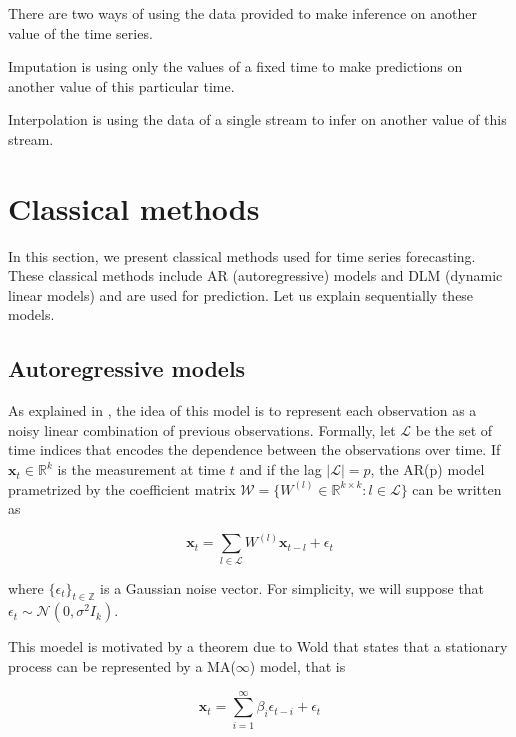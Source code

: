 \documentclass{article}
\begin{document}
There are two ways of using the data provided to make inference on another value of the time series.
\begin{definition}{Imputation}
is using only the values of a fixed time to make predictions on another value of this particular time.
\end{definition}

\begin{definition}{Interpolation}
 is using the data of a single stream to infer on another value of this stream.
\end{definition}

\section{Classical methods}
\label{clas}
In this section, we present classical methods used for time series forecasting.
These classical methods include AR (autoregressive) models and DLM (dynamic linear models) and are used for prediction.
Let us explain sequentially these models.

\subsection*{Autoregressive models}
As explained in \cite{pmlr-v37-anava15}, the idea of this model is to represent each observation as a noisy linear combination of previous observations.
Formally, let $\mathcal{L}$ be the set of time indices that encodes the dependence between the observations over time. If $\mathbf{x}_t \in \mathbb{R}^k$ is the measurement at time $t$ and if the lag $|\mathcal{L}| = p$, the AR(p) model prametrized by the coefficient matrix $\mathcal{W} = \{W^{(l)} \in \mathbb{R}^{k \times k} : l \in \mathcal{L} \}$ can be written as

\begin{equation}
\mathbf{x}_t = \sum_{l \in \mathcal{L}} W^{(l)} \mathbf{x}_{t-l} + \epsilon_t
\label{eq:ar}
\end{equation}

where $\{ \epsilon_t \}_{t \in \mathbb{Z}}$ is a Gaussian noise vector. For simplicity, we will suppose that $\epsilon_t \sim \mathcal{N}(0, \sigma^2 I_k)$.

This moedel is motivated by a theorem due to Wold that states that a stationary process can be represented by a MA($\infty$) model, that is

$$\mathbf{x}_t = \sum_{i=1}^{\infty} \beta_i \epsilon_{t-i} + \epsilon_t$$
\end{document}

